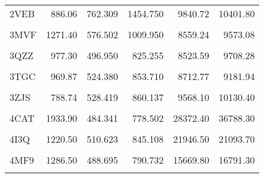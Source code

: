 \begin{table}[t!]
{\begin{tabular}{lrrrrr}
				2VEB & 886.06 & 762.309 & 1454.750 & 9840.72 & 10401.80\\
				\addlinespace
				\cellcolor{gray!6}{3HX9} & \cellcolor{gray!6}{1844.50} & \cellcolor{gray!6}{785.442} & \cellcolor{gray!6}{1168.200} & \cellcolor{gray!6}{5819.08} & \cellcolor{gray!6}{7189.03}\\
				3MVF & 1271.40 & 576.502 & 1009.950 & 8559.24 & 9573.08\\
				\cellcolor{gray!6}{3QZN} & \cellcolor{gray!6}{726.52} & \cellcolor{gray!6}{664.858} & \cellcolor{gray!6}{1221.330} & \cellcolor{gray!6}{6133.24} & \cellcolor{gray!6}{7179.49}\\
				3QZZ & 977.30 & 496.950 & 825.255 & 8523.59 & 9708.28\\
				\cellcolor{gray!6}{3SIK} & \cellcolor{gray!6}{492.15} & \cellcolor{gray!6}{498.621} & \cellcolor{gray!6}{823.565} & \cellcolor{gray!6}{6495.38} & \cellcolor{gray!6}{7739.06}\\
				\addlinespace
				3TGC & 969.87 & 524.380 & 853.710 & 8712.77 & 9181.94\\
				\cellcolor{gray!6}{3VP5} & \cellcolor{gray!6}{1094.60} & \cellcolor{gray!6}{602.790} & \cellcolor{gray!6}{1050.820} & \cellcolor{gray!6}{9801.82} & \cellcolor{gray!6}{10810.80}\\
				3ZJS & 788.74 & 528.419 & 860.137 & 9568.10 & 10130.40\\
				\cellcolor{gray!6}{4B8N} & \cellcolor{gray!6}{841.27} & \cellcolor{gray!6}{569.302} & \cellcolor{gray!6}{990.216} & \cellcolor{gray!6}{4560.39} & \cellcolor{gray!6}{5458.66}\\
				4CAT & 1933.90 & 484.341 & 778.502 & 28372.40 & 36788.30\\
				\addlinespace
				\cellcolor{gray!6}{4CDP} & \cellcolor{gray!6}{1053.70} & \cellcolor{gray!6}{1425.050} & \cellcolor{gray!6}{3141.090} & \cellcolor{gray!6}{14733.50} & \cellcolor{gray!6}{15887.40}\\
				4I3Q & 1220.50 & 510.623 & 845.108 & 21946.50 & 21093.70\\
				\cellcolor{gray!6}{4JET} & \cellcolor{gray!6}{1010.80} & \cellcolor{gray!6}{495.992} & \cellcolor{gray!6}{818.131} & \cellcolor{gray!6}{7887.81} & \cellcolor{gray!6}{8695.85}\\
				4MF9 & 1286.50 & 488.695 & 790.732 & 15669.80 & 16791.30\\
				\cellcolor{gray!6}{4MYP} & \cellcolor{gray!6}{610.72} & \cellcolor{gray!6}{963.019} & \cellcolor{gray!6}{1834.680} & \cellcolor{gray!6}{6285.40} & \cellcolor{gray!6}{7351.53}\\

\end{tabular}}
\end{table}
